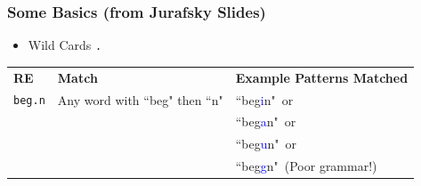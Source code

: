\documentclass{beamer}
\begin{document}
\begin{frame}
\frametitle{Some Basics (from Jurafsky Slides) } 
\begin{itemize}
\item  Wild Cards \alert{{\tt .} } 
\end{itemize}
\begin{center}
\scriptsize
\begin{tabular}{lll}
\textbf{RE} & \textbf{Match} & \textbf{Example Patterns Matched}\\
{\tt beg\alert{.}n} & Any word with ``beg" then ``n" & ``beg\textcolor{blue}{i}n"~or \\
                          &                                            &  ``beg\textcolor{blue}{a}n"~or \\
                          &                                            &  ``beg\textcolor{blue}{u}n"~or \\
                          &                                            &  ``beg\textcolor{blue}{g}n"~(Poor grammar!) 
                          
 \end{tabular}
 \end{center}
 
 \end{frame}
\end{document}

